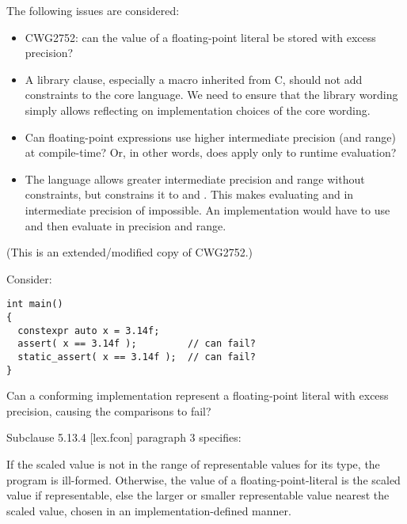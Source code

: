 The following issues are considered:
\begin{itemize}
  \item CWG2752: can the value of a floating-point literal be stored with
    excess precision?

  \item A library clause, especially a macro inherited from C, should not add
    constraints to the core language.
    We need to ensure that the library wording simply allows reflecting on
    implementation choices of the core wording.

  \item Can floating-point expressions use higher intermediate precision (and
    range) at compile-time?
    Or, in other words, does  apply only to runtime
    evaluation?

  \item The language allows greater intermediate precision and range without
    constraints, but  constrains it to  and
    .
    This makes evaluating  and  in
    intermediate precision of  impossible.
    An implementation would have to use  and then evaluate
     in  precision and range.
\end{itemize}

(This is an extended/modified copy of CWG2752.)

Consider:

\begin{lstlisting}
int main()
{
  constexpr auto x = 3.14f;
  assert( x == 3.14f );         // can fail?
  static_assert( x == 3.14f );  // can fail?
}
\end{lstlisting}

Can a conforming implementation represent a floating-point literal with excess
precision, causing the comparisons to fail?

Subclause 5.13.4 [lex.fcon] paragraph 3 specifies:

\begin{wgText}
  \setcounter{Paras}{2}\pnum
  If the scaled value is not in the range of representable values for its type,
  the program is ill-formed. Otherwise, the value of a floating-point-literal
  is the scaled value if representable, else the larger or smaller
  representable value nearest the scaled value, chosen in an
  implementation-defined manner.
\end{wgText}

